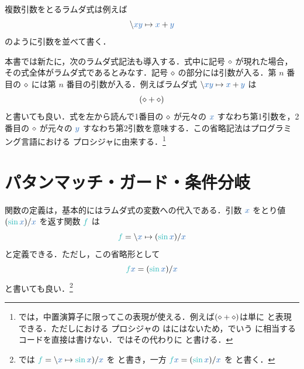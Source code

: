 \documentclass[a5paper,twoside,fleqn,draft]{jsbook}
\begin{document}
複数引数をとるラムダ式は例えば
\begin{equation}
  \hLambdaSyntax{\hVar{x}\hVar{y}}{\hVar{x}+\hVar{y}}
\end{equation}
のように引数を並べて書く．

\separator

本書では新たに，次のラムダ式記法も導入する．式中に記号 $\diamond$ が現れた場合，その式全体がラムダ式であるとみなす．記号 $\diamond$ の部分には引数が入る．第 $n$ 番目の $\diamond$ には第 $n$ 番目の引数が入る．例えばラムダ式 $\hLambdaSyntax{\hVar{x}\hVar{y}}{\hVar{x}+\hVar{y}}$ は
\begin{equation}
  (\diamond+\diamond)
\end{equation}
と書いても良い．式を左から読んで1番目の $\diamond$ が元々の $\hVar{x}$ すなわち第1引数を，2番目の $\diamond$ が元々の $\hVar{y}$ すなわち第2引数を意味する．この省略記法はプログラミング言語\scheme における  プロシジャに由来する．\footnote{\haskell では，中置演算子に限ってこの表現が使える．例えば$(\diamond+\diamond)$は単に \code{(+)} と表現できる．ただし\scheme における  プロシジャの \code{<>} は\haskell にはないため，\scheme でいう  に相当するコードを直接は書けない．\haskell ではその代わりに  と書ける．}

\section{パタンマッチ・ガード・条件分岐}

関数の定義は，基本的にはラムダ式の変数への代入である．引数 $\hVar{x}$ をとり値 $(\hSin\hVar{x})/\hVar{x}$ を返す関数 $\hFunc{f}$ は
\begin{equation}
  \hFunc{f}=\hLambdaSyntax{\hVar{x}}{(\hSin\hVar{x})/\hVar{x}}
\end{equation}
と定義できる．ただし，この省略形として
\begin{equation}
  \hFunc{f}\hVar{x}
  =(\hSin\hVar{x})/\hVar{x}
\end{equation}
と書いても良い．\footnote{\haskell では $\hFunc{f}=\hLambdaSyntax{\hVar{x}}{\hSin\hVar{x})/\hVar{x}}$ を  と書き，一方 $\hFunc{f}\hVar{x}=(\hSin\hVar{x})/\hVar{x}$ を と書く．}

\separator
\end{document}

